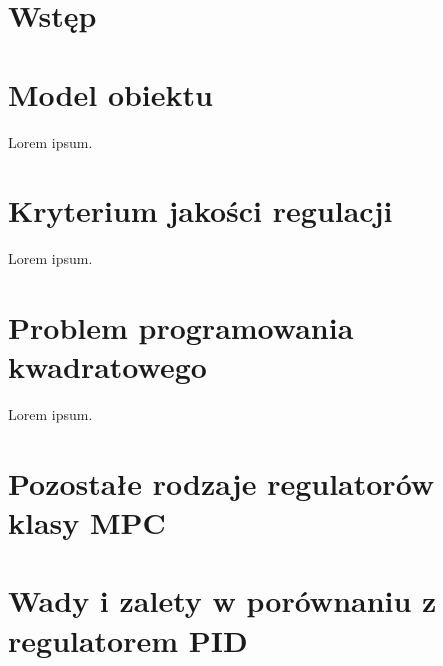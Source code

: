 \section{Wstęp}

\section{Model obiektu} \label{sec:model}
Lorem ipsum.

\section{Kryterium jakości regulacji} \label{sec:quality}
Lorem ipsum.

\section{Problem programowania kwadratowego} \label{sec:qp}
Lorem ipsum.

\section{Pozostałe rodzaje regulatorów klasy MPC} \label{sec:other}

\section{Wady i zalety w porównaniu z regulatorem PID} \label{sec:comparison}
